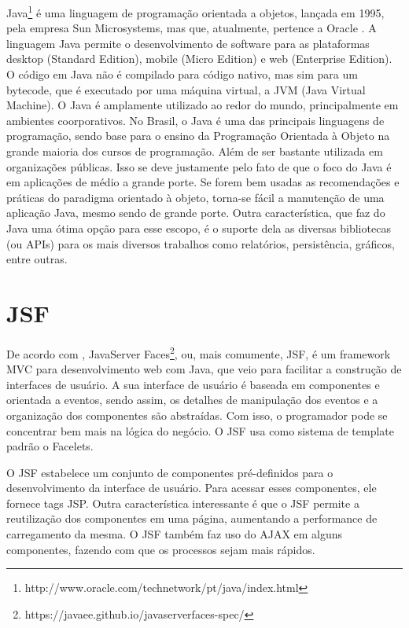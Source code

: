 Java\footnote{http://www.oracle.com/technetwork/pt/java/index.html} é uma linguagem de programação orientada a objetos, lançada em 1995, pela empresa Sun Microsystems, mas que, atualmente, pertence a Oracle \cite{Deitel2009}. A linguagem Java permite o desenvolvimento de software para as plataformas desktop (Standard Edition), mobile (Micro Edition) e web (Enterprise Edition). O código em Java não é compilado para código nativo, mas sim para um bytecode, que é executado por uma máquina virtual, a JVM (Java Virtual Machine). 
O Java é amplamente utilizado ao redor do mundo, principalmente em ambientes coorporativos. No Brasil, o Java é uma das principais linguagens de programação, sendo base para o ensino da Programação Orientada à Objeto na grande maioria dos cursos de programação. Além de ser bastante utilizada em organizações públicas. Isso se deve justamente pelo fato de que o foco do Java é em aplicações de médio a grande porte. Se forem bem usadas as recomendações e práticas do paradigma orientado à objeto, torna-se fácil a manutenção de uma aplicação Java, mesmo sendo de grande porte. Outra característica, que faz do Java uma ótima opção para esse escopo, é o suporte dela as diversas bibliotecas (ou APIs) para os mais diversos trabalhos como relatórios, persistência, gráficos, entre outras. 

\section{JSF}
\label{sec:embasamentoTeoricoJSF}

De acordo com , JavaServer Faces\footnote{https://javaee.github.io/javaserverfaces-spec/}, ou, mais comumente, JSF, é um framework MVC para desenvolvimento web com Java, que veio para facilitar a construção de interfaces de usuário. A sua interface de usuário é baseada em componentes e orientada a eventos, sendo assim, os detalhes de manipulação dos eventos e a organização dos componentes são abstraídas. Com isso, o programador pode se concentrar bem mais na lógica do negócio. O JSF usa como sistema de template padrão o Facelets.

O JSF estabelece um conjunto de componentes pré-definidos para o desenvolvimento da interface de usuário. Para acessar esses componentes, ele fornece tags JSP. Outra característica interessante é que o JSF permite a reutilização dos componentes em uma página, aumentando a performance de carregamento da mesma. O JSF também faz uso do AJAX em alguns componentes, fazendo com que os processos sejam mais rápidos.

